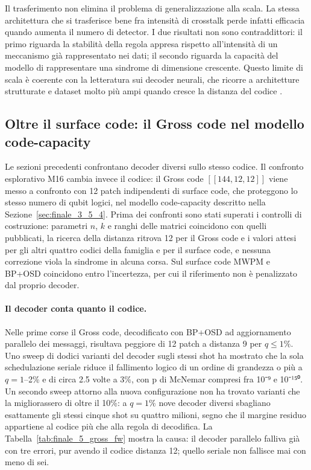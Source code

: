 Il trasferimento non elimina il problema di generalizzazione alla scala. La stessa architettura che si trasferisce bene fra intensità di crosstalk perde infatti efficacia quando aumenta il numero di detector. I due risultati non sono contraddittori: il primo riguarda la stabilità della regola appresa rispetto all'intensità di un meccanismo già rappresentato nei dati; il secondo riguarda la capacità del modello di rappresentare una sindrome di dimensione crescente. Questo limite di scala è coerente con la letteratura sui decoder neurali, che ricorre a architetture strutturate e dataset molto più ampi quando cresce la distanza del codice \cite{alphaqubit2024,torlaiMelko2017,yan2026}.

\subsection{Oltre il surface code: il Gross code nel modello code-capacity}\label{sec:finale_5_3_8}

Le sezioni precedenti confrontano decoder diversi sullo stesso codice. Il confronto esplorativo M16 cambia invece il codice: il Gross code \ensuremath{[[144,12,12]]} \cite{bravyi2024} viene messo a confronto con 12 patch indipendenti di surface code, che proteggono lo stesso numero di qubit logici, nel modello code-capacity descritto nella Sezione~\ref{sec:finale_3_5_4}. Prima dei confronti sono stati superati i controlli di costruzione: parametri \(n\), \(k\) e ranghi delle matrici coincidono con quelli pubblicati, la ricerca della distanza ritrova 12 per il Gross code e i valori attesi per gli altri quattro codici della famiglia e per il surface code, e nessuna correzione viola la sindrome in alcuna corsa. Sul surface code MWPM e BP+OSD coincidono entro l'incertezza, per cui il riferimento non è penalizzato dal proprio decoder.

\paragraph{Il decoder conta quanto il codice.} Nelle prime corse il Gross code, decodificato con BP+OSD ad aggiornamento parallelo dei messaggi, risultava peggiore di 12 patch a distanza 9 per \(q \le 1\%\). Uno sweep di dodici varianti del decoder sugli stessi shot ha mostrato che la sola schedulazione seriale riduce il fallimento logico di un ordine di grandezza o più a \(q = 1\)--2\% e di circa 2.5 volte a 3\%, con p di McNemar compresi fra 10⁻⁹ e 10⁻¹⁵⁰. Un secondo sweep attorno alla nuova configurazione non ha trovato varianti che la migliorassero di oltre il 10\%: a \(q = 1\%\) nove decoder diversi sbagliano esattamente gli stessi cinque shot su quattro milioni, segno che il margine residuo appartiene al codice più che alla regola di decodifica. La Tabella~\ref{tab:finale_5_gross_fw} mostra la causa: il decoder parallelo falliva già con tre errori, pur avendo il codice distanza 12; quello seriale non fallisce mai con meno di sei.

